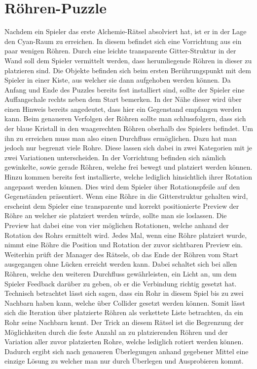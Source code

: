 \section{Röhren-Puzzle}
Nachdem ein Spieler das erste Alchemie-Rätsel absolviert hat, ist er in der Lage den Cyan-Raum zu erreichen. In diesem befindet sich eine Vorrichtung aus ein paar wenigen Röhren. Durch eine leichte transparente Gitter-Struktur in der Wand soll dem Spieler vermittelt werden, dass herumliegende Röhren in dieser zu platzieren sind. Die Objekte befinden sich beim ersten Berührungspunkt mit dem Spieler in einer Kiste, aus welcher sie dann aufgehoben werden können. Da Anfang und Ende des Puzzles bereits fest installiert sind, sollte der Spieler eine Auffangschale rechts neben dem Start bemerken. In der Nähe dieser wird über einen Hinweis bereits angedeutet, dass hier ein Gegenstand empfangen werden kann. Beim genaueren Verfolgen der Röhren sollte man schlussfolgern, dass sich der blaue Kristall in den waagerechten Röhren oberhalb des Spielers befindet. Um ihn zu erreichen muss man also einen Durchfluss ermöglichen. Dazu hat man jedoch nur begrenzt viele Rohre. Diese lassen sich dabei in zwei Kategorien mit je zwei Variationen unterscheiden. In der Vorrichtung befinden sich nämlich gewinkelte, sowie gerade Röhren, welche frei bewegt und platziert werden können. Hinzu kommen bereits fest installierte, welche lediglich hinsichtlich ihrer Rotation angepasst werden können. Dies wird dem Spieler über Rotationspfeile auf den Gegenständen präsentiert. Wenn eine Röhre in die Gitterstruktur gehalten wird, erscheint dem Spieler eine transparente und korrekt positionierte Preview der Röhre an welcher sie platziert werden würde, sollte man sie loslassen. Die Preview hat dabei eine von vier möglichen Rotationen, welche anhand der Rotation des Rohrs ermittelt wird. Jedes Mal, wenn eine Röhre platziert wurde, nimmt eine Röhre die Position und Rotation der zuvor sichtbaren Preview ein. Weiterhin prüft der Manager des Rätsels, ob das Ende der Röhren vom Start ausgegangen ohne Lücken erreicht werden kann. Dabei schaltet sich bei allen Röhren, welche den weiteren Durchfluss gewährleisten, ein Licht an, um dem Spieler Feedback darüber zu geben, ob er die Verbindung richtig gesetzt hat. Technisch betrachtet lässt sich sagen, dass ein Rohr in diesem Spiel bis zu zwei Nachbarn haben kann, welche über Collider gesetzt werden können. Somit lässt sich die Iteration über platzierte Röhren als verkettete Liste betrachten, da ein Rohr seine Nachbarn kennt. Der Trick an diesem Rätsel ist die Begrenzung der Möglichkeiten durch die feste Anzahl an zu platzierenden Röhren und der Variation aller zuvor platzierten Rohre, welche lediglich rotiert werden können. Dadurch ergibt sich nach genaueren Überlegungen anhand gegebener Mittel eine einzige Lösung zu welcher man nur durch Überlegen und Ausprobieren kommt.\\

